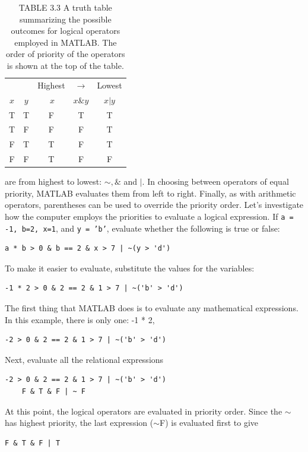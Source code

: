 \documentclass[../main.tex]{subfiles}
\begin{document}
\begin{table}[H]
    \caption*{TABLE 3.3 A truth table summarizing the possible outcomes for logical operators
    employed in MATLAB. The order of priority of the operators is shown at
    the top of the table.}
    \begin{tabular}{ccccc }
        \hline
          &&      Highest &$\longrightarrow$ &         Lowest\\
        $x$&$y$ &$~x$ &$x\&y$ &$x | y$\\
        \hline
        T&T& F& T& T\\
        T&F &F &F &T\\
        F&T &T& F &T\\
        F&F &T &F& F\\
        \hline
    \end{tabular}	
\end{table}


are from highest to lowest: $\sim , \&$ and $|$. In choosing between operators of equal priority,
MATLAB evaluates them from left to right. Finally, as with arithmetic operators, parentheses can be used to override the priority order.
Let's investigate how the computer employs the priorities to evaluate a logical expression. If \texttt{a = -1, b=2, x=1}, and \texttt{y = 'b'}, evaluate whether the following is true or false:
\begin{lstlisting}[frame=none, numbers=none]
    a * b > 0 & b == 2 & x > 7 | ~(y > 'd')
\end{lstlisting}

To make it easier to evaluate, substitute the values for the variables:
\begin{lstlisting}[frame=none, numbers=none]
    -1 * 2 > 0 & 2 == 2 & 1 > 7 | ~('b' > 'd')
\end{lstlisting}

The first thing that MATLAB does is to evaluate any mathematical expressions. In this
example, there is only one: -1 * 2,
\begin{lstlisting}[frame=none, numbers=none]
    -2 > 0 & 2 == 2 & 1 > 7 | ~('b' > 'd')
\end{lstlisting}
Next, evaluate all the relational expressions
\begin{lstlisting}[frame=none, numbers=none]
    -2 > 0 & 2 == 2 & 1 > 7 | ~('b' > 'd')
    F & T & F | ~ F
\end{lstlisting}

At this point, the logical operators are evaluated in priority order. Since the $\sim$ has highest
priority, the last expression ($\sim$F) is evaluated first to give
\begin{lstlisting}[frame=none, numbers=none]
    F & T & F | T
\end{lstlisting}
\end{document}
